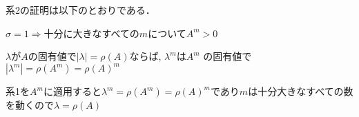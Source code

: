 系2の証明は以下のとおりである．

$\sigma=1\Rightarrow$十分に大きなすべての$m$について$A^m >0$

$\lambda$が$A$の固有値で$|\lambda |=\rho (A)$ならば,
${\lambda}^m$は$A^m$
の固有値で$|{\lambda}^m |=\rho (A^m )={\rho (A)}^m$

系1を$A^m$に適用すると${\lambda}^m =\rho (A^m )={\rho (A)}^m$であり$m$は十分大きなすべての数を動くので$\lambda =\rho (A)$
